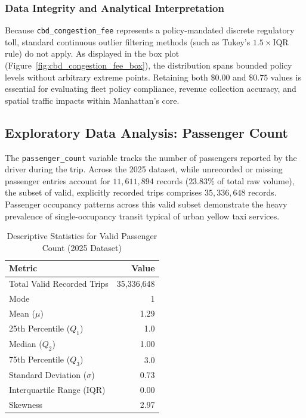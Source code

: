 \documentclass[11pt,a4paper]{article}
\begin{document}
\subsubsection{Data Integrity and Analytical Interpretation}
Because \texttt{cbd\_congestion\_fee} represents a policy-mandated discrete regulatory toll, standard continuous outlier filtering methods (such as Tukey's $1.5 \times \text{IQR}$ rule) do not apply. As displayed in the box plot (Figure~\ref{fig:cbd_congestion_fee_box}), the distribution spans bounded policy levels without arbitrary extreme points. Retaining both $\$0.00$ and $\$0.75$ values is essential for evaluating fleet policy compliance, revenue collection accuracy, and spatial traffic impacts within Manhattan's core.


\subsection{Exploratory Data Analysis: Passenger Count}
\label{sec:eda_passenger_count}

The \texttt{passenger\_count} variable tracks the number of passengers reported by the driver during the trip. Across the 2025 dataset, while unrecorded or missing passenger entries account for $11,611,894$ records ($23.83\%$ of total raw volume), the subset of valid, explicitly recorded trips comprises $35,336,648$ records. Passenger occupancy patterns across this valid subset demonstrate the heavy prevalence of single-occupancy transit typical of urban yellow taxi services.

\begin{table}[htbp]
\centering
\caption{Descriptive Statistics for Valid Passenger Count (2025 Dataset)}
\label{tab:stats_passenger_count}
\begin{tabular}{lr}
\toprule
\textbf{Metric} & \textbf{Value} \\
\midrule
Total Valid Recorded Trips & 35,336,648 \\
Mode & 1 \\
Mean ($\mu$) & 1.29 \\
25th Percentile ($Q_1$) & 1.0 \\
Median ($Q_2$) & 1.00 \\
75th Percentile ($Q_3$) & 3.0 \\
Standard Deviation ($\sigma$) & 0.73 \\
Interquartile Range (IQR) & 0.00 \\
Skewness & 2.97 \\
\bottomrule
\end{tabular}
\end{table}
\end{document}
